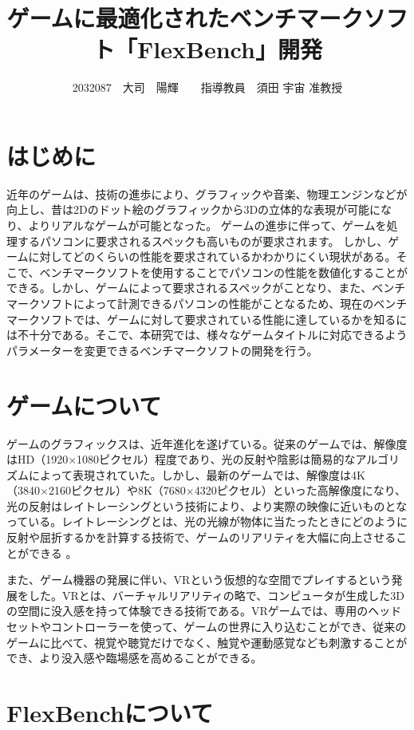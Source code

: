\documentclass[twocolumn,10pt,a4j]{ltjsarticle}
\title{ゲームに最適化されたベンチマークソフト「FlexBench」開発}
\author{2032087　大司　陽輝　　指導教員　須田 宇宙 准教授}
\date{}
\begin{document}
\maketitle

\section{はじめに}
 
近年のゲームは、技術の進歩により、グラフィックや音楽、物理エンジンなどが向上し、昔は2Dのドット絵のグラフィックから3Dの立体的な表現が可能になり、よりリアルなゲームが可能となった。
ゲームの進歩に伴って、ゲームを処理するパソコンに要求されるスペックも高いものが要求されます。
しかし、ゲームに対してどのくらいの性能を要求されているかわかりにくい現状がある。そこで、ベンチマークソフトを使用することでパソコンの性能を数値化することができる。しかし、ゲームによって要求されるスペックがことなり、また、ベンチマークソフトによって計測できるパソコンの性能がことなるため、現在のベンチマークソフトでは、ゲームに対して要求されている性能に達しているかを知るには不十分である。そこで、本研究では、様々なゲームタイトルに対応できるようパラメーターを変更できるベンチマークソフトの開発を行う。

\section{ゲームについて}
ゲームのグラフィックスは、近年進化を遂げている。従来のゲームでは、解像度はHD（1920×1080ピクセル）程度であり、光の反射や陰影は簡易的なアルゴリズムによって表現されていた。しかし、最新のゲームでは、解像度は4K（3840×2160ピクセル）や8K（7680×4320ピクセル）といった高解像度になり、光の反射はレイトレーシングという技術により、より実際の映像に近いものとなっている。レイトレーシングとは、光の光線が物体に当たったときにどのように反射や屈折するかを計算する技術で、ゲームのリアリティを大幅に向上させることができる 。

また、ゲーム機器の発展に伴い、VRという仮想的な空間でプレイするという発展をした。VRとは、バーチャルリアリティの略で、コンピュータが生成した3Dの空間に没入感を持って体験できる技術である。VRゲームでは、専用のヘッドセットやコントローラーを使って、ゲームの世界に入り込むことができ、従来のゲームに比べて、視覚や聴覚だけでなく、触覚や運動感覚なども刺激することができ、より没入感や臨場感を高めることができる。

\section{FlexBenchについて}
\end{document}
